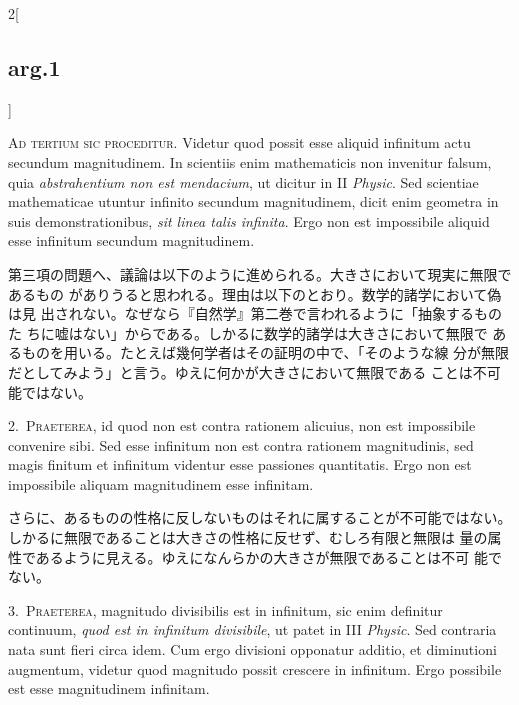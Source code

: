 \documentclass[paper=a4paper,fontsize=10pt,jafontsize=9pt,titlepage]{jlreq}
\begin{document}
\begin{paracol}{2}[\subsection{arg.1}]

{\huge A}{\scshape d tertium sic proceditur}. Videtur quod possit esse
 aliquid infinitum actu secundum magnitudinem. In scientiis enim
 mathematicis non invenitur falsum, quia {\itshape abstrahentium non est
 mendacium}, ut dicitur in II {\itshape Physic}. Sed scientiae
 mathematicae utuntur infinito secundum magnitudinem, dicit enim
 geometra in suis demonstrationibus, {\itshape sit linea talis
 infinita}. Ergo non est impossibile aliquid esse infinitum secundum
 magnitudinem.

\switchcolumn

第三項の問題へ、議論は以下のように進められる。大きさにおいて現実に無限であるもの
 がありうると思われる。理由は以下のとおり。数学的諸学において偽は見
 出されない。なぜなら『自然学』第二巻で言われるように「抽象するものた
 ちに嘘はない」からである。しかるに数学的諸学は大きさにおいて無限で
 あるものを用いる。たとえば幾何学者はその証明の中で、「そのような線
 分が無限だとしてみよう」と言う。ゆえに何かが大きさにおいて無限である
 ことは不可能ではない。


2.~{\scshape Praeterea}, id quod non est contra rationem alicuius, non est
 impossibile convenire sibi. Sed esse infinitum non est contra rationem
 magnitudinis, sed magis finitum et infinitum videntur esse passiones
 quantitatis. Ergo non est impossibile aliquam magnitudinem esse
 infinitam.

\switchcolumn

さらに、あるものの性格に反しないものはそれに属することが不可能ではない。
 しかるに無限であることは大きさの性格に反せず、むしろ有限と無限は
 量の属性であるように見える。ゆえになんらかの大きさが無限であることは不可
 能でない。


3.~{\scshape Praeterea}, magnitudo divisibilis est in infinitum, sic enim definitur
 continuum, {\itshape quod est in infinitum divisibile}, ut patet in III
 {\itshape Physic}. Sed contraria nata sunt fieri circa idem. Cum ergo divisioni
 opponatur additio, et diminutioni augmentum, videtur quod magnitudo
 possit crescere in infinitum. Ergo possibile est esse magnitudinem
 infinitam.


\end{paracol}
\end{document}
